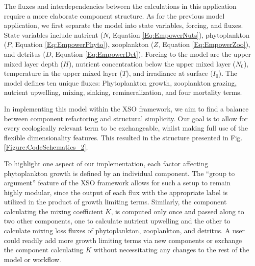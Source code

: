 \documentclass[gmd, manuscript]{copernicus}
\begin{document}
The fluxes and interdependencies between the calculations in this application require a more elaborate component structure. As for the previous model application, we first separate the model into state variables, forcing, and fluxes.  State variables include nutrient ($N$, Equation \ref{Eq:EmpowerNuts}), phytoplankton ($P$, Equation \ref{Eq:EmpowerPhyto}), zooplankton ($Z$, Equation \ref{Eq:EmpowerZoo}), and detritus ($D$, Equation \ref{Eq:EmpowerDet}). Forcing to the model are the upper mixed layer depth ($H$), nutrient concentration below the upper mixed layer ($N_0$), temperature in the upper mixed layer ($T$), and irradiance at surface ($I_{0}$). The model defines ten unique fluxes: Phytoplankton growth, zooplankton grazing, nutrient upwelling, mixing, sinking, remineralization, and four mortality terms.

In implementing this model within the XSO framework, we aim to find a balance between component refactoring and structural simplicity. Our goal is to allow for every ecologically relevant term to be exchangeable, whilst making full use of the flexible dimensionality features. This resulted in the structure presented in Fig. \ref{Figure:CodeSchematics_2}.

To highlight one aspect of our implementation, each factor affecting phytoplankton growth is defined by an individual component. The “group to argument” feature of the XSO framework allows for such a setup to remain highly modular, since the output of each flux with the appropriate label is utilized in the product of growth limiting terms. 
Similarly, the component calculating the mixing coefficient $K$, is computed only once and passed along to two other components, one to calculate nutrient upwelling and the other to calculate mixing loss fluxes of phytoplankton, zooplankton, and detritus. A user could readily add more growth limiting terms via new components or exchange the component calculating $K$ without necessitating any changes to the rest of the model or workflow.
\end{document}
